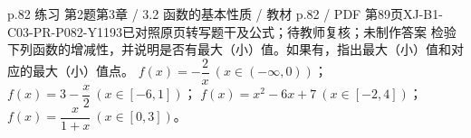 \par\noindent\begin{minipage}{\linewidth}
\begin{bankitem}{p.82 练习 第2题}{第3章 / 3.2 函数的基本性质 / 教材 p.82 / PDF 第89页}{XJ-B1-C03-PR-P082-Y1193}{已对照原页转写题干及公式；待教师复核；未制作答案}
检验下列函数的增减性，并说明是否有最大（小）值。如果有，指出最大（小）值和对应的最大（小）值点。
$f(x)=-\dfrac2x\ (x\in(-\infty,0))$；
$f(x)=3-\dfrac x2\ (x\in[-6,1])$；
$f(x)=x^2-6x+7\ (x\in[-2,4])$；
$f(x)=\dfrac x{1+x}\ (x\in[0,3])$。
\end{bankitem}
\end{minipage}\par\medskip
